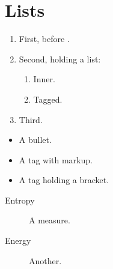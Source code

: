 \flmHeading[toc=true]
\section{Lists}{\flmLabels{}}

\begin{enumerate}
\item\flmLabels{\label{ref1}} First, before .
\item\flmLabels{\label{ref2}} Second, holding a list:
\begin{enumerate}
\item Inner.
\item[Custom]\flmLabels{\label{ref3}} Tagged.
\end{enumerate}
\item Third.
\end{enumerate}

\begin{itemize}
\item A bullet.
\item[{\emph{Rich} tag}] A tag with markup.
\item[{a]b}] A tag holding a bracket.
\end{itemize}

\begin{description}
\item[Entropy]\flmLabels{\label{ref4}} A measure.
\item[Energy] Another.
\end{description}

